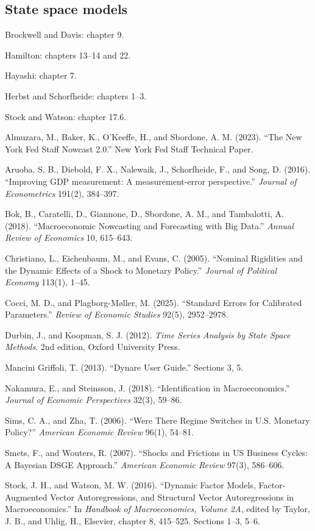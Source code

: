 \documentclass[12pt]{article}
\begin{document}
\subsection{State space models}
\begin{description}
\item Brockwell and Davis: chapter 9.
\item Hamilton: chapters 13--14 and 22.
\item Hayashi: chapter 7.
\item[*] Herbst and Schorfheide: chapters 1--3.
\item[*] Stock and Watson: chapter 17.6.
\item Almuzara, M., Baker, K., O'Keeffe, H., and Sbordone, A. M. (2023). ``The New York Fed Staff Nowcast 2.0.'' New York Fed Staff Technical Paper.
\item Aruoba, S. B., Diebold, F. X., Nalewaik, J., Schorfheide, F., and Song, D. (2016). ``Improving GDP measurement: A measurement-error perspective.'' \emph{Journal of Econometrics} 191(2), 384--397.
\item[*] Bok, B., Caratelli, D., Giannone, D., Sbordone, A. M., and Tambalotti, A. (2018). ``Macroeconomic Nowcasting and Forecasting with Big Data.'' \emph{Annual Review of Economics} 10, 615--643.
\item Christiano, L., Eichenbaum, M., and Evans, C. (2005). ``Nominal Rigidities and the Dynamic Effects of a Shock to Monetary Policy.'' \emph{Journal of Political Economy} 113(1), 1--45.
\item Cocci, M. D., and Plagborg-M{\o}ller, M. (2025). ``Standard Errors for Calibrated Parameters.'' \emph{Review of Economic Studies} 92(5), 2952--2978.
\item Durbin, J., and Koopman, S. J. (2012). \emph{Time Series Analysis by State Space Methods}. 2nd edition, Oxford University Press.
\item[*] Mancini Griffoli, T. (2013). ``Dynare User Guide.'' Sections 3, 5.
\item[*] Nakamura, E., and Steinsson, J. (2018). ``Identification in Macroeconomics.'' \emph{Journal of Economic Perspectives} 32(3), 59--86.
\item Sims, C. A., and Zha, T. (2006). ``Were There Regime Switches in U.S. Monetary Policy?'' \emph{American Economic Review} 96(1), 54--81.
\item Smets, F., and Wouters, R. (2007). ``Shocks and Frictions in US Business Cycles: A Bayesian DSGE Approach.'' \emph{American Economic Review} 97(3), 586--606.
\item Stock, J. H., and Watson, M. W. (2016). ``Dynamic Factor Models, Factor-Augmented Vector Autoregressions, and Structural Vector Autoregressions in Macroeconomics.'' In \emph{Handbook of Macroeconomics, Volume 2A}, edited by Taylor, J. B., and Uhlig, H., Elsevier, chapter 8, 415--525. Sections 1--3, 5--6.
\end{description}
\end{document}
